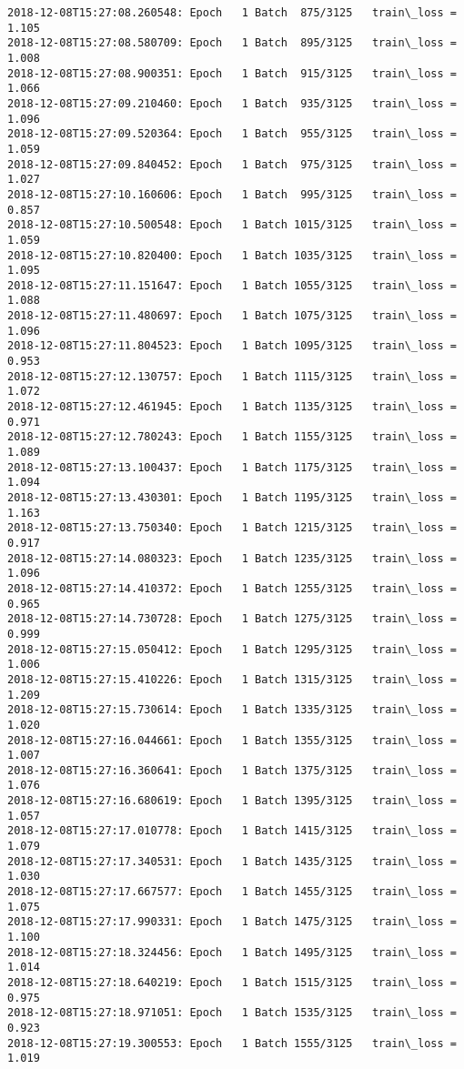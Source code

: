 \documentclass[11pt]{article}
\begin{document}
\begin{Verbatim}[commandchars=\\\{\}]
2018-12-08T15:27:08.260548: Epoch   1 Batch  875/3125   train\_loss = 1.105
2018-12-08T15:27:08.580709: Epoch   1 Batch  895/3125   train\_loss = 1.008
2018-12-08T15:27:08.900351: Epoch   1 Batch  915/3125   train\_loss = 1.066
2018-12-08T15:27:09.210460: Epoch   1 Batch  935/3125   train\_loss = 1.096
2018-12-08T15:27:09.520364: Epoch   1 Batch  955/3125   train\_loss = 1.059
2018-12-08T15:27:09.840452: Epoch   1 Batch  975/3125   train\_loss = 1.027
2018-12-08T15:27:10.160606: Epoch   1 Batch  995/3125   train\_loss = 0.857
2018-12-08T15:27:10.500548: Epoch   1 Batch 1015/3125   train\_loss = 1.059
2018-12-08T15:27:10.820400: Epoch   1 Batch 1035/3125   train\_loss = 1.095
2018-12-08T15:27:11.151647: Epoch   1 Batch 1055/3125   train\_loss = 1.088
2018-12-08T15:27:11.480697: Epoch   1 Batch 1075/3125   train\_loss = 1.096
2018-12-08T15:27:11.804523: Epoch   1 Batch 1095/3125   train\_loss = 0.953
2018-12-08T15:27:12.130757: Epoch   1 Batch 1115/3125   train\_loss = 1.072
2018-12-08T15:27:12.461945: Epoch   1 Batch 1135/3125   train\_loss = 0.971
2018-12-08T15:27:12.780243: Epoch   1 Batch 1155/3125   train\_loss = 1.089
2018-12-08T15:27:13.100437: Epoch   1 Batch 1175/3125   train\_loss = 1.094
2018-12-08T15:27:13.430301: Epoch   1 Batch 1195/3125   train\_loss = 1.163
2018-12-08T15:27:13.750340: Epoch   1 Batch 1215/3125   train\_loss = 0.917
2018-12-08T15:27:14.080323: Epoch   1 Batch 1235/3125   train\_loss = 1.096
2018-12-08T15:27:14.410372: Epoch   1 Batch 1255/3125   train\_loss = 0.965
2018-12-08T15:27:14.730728: Epoch   1 Batch 1275/3125   train\_loss = 0.999
2018-12-08T15:27:15.050412: Epoch   1 Batch 1295/3125   train\_loss = 1.006
2018-12-08T15:27:15.410226: Epoch   1 Batch 1315/3125   train\_loss = 1.209
2018-12-08T15:27:15.730614: Epoch   1 Batch 1335/3125   train\_loss = 1.020
2018-12-08T15:27:16.044661: Epoch   1 Batch 1355/3125   train\_loss = 1.007
2018-12-08T15:27:16.360641: Epoch   1 Batch 1375/3125   train\_loss = 1.076
2018-12-08T15:27:16.680619: Epoch   1 Batch 1395/3125   train\_loss = 1.057
2018-12-08T15:27:17.010778: Epoch   1 Batch 1415/3125   train\_loss = 1.079
2018-12-08T15:27:17.340531: Epoch   1 Batch 1435/3125   train\_loss = 1.030
2018-12-08T15:27:17.667577: Epoch   1 Batch 1455/3125   train\_loss = 1.075
2018-12-08T15:27:17.990331: Epoch   1 Batch 1475/3125   train\_loss = 1.100
2018-12-08T15:27:18.324456: Epoch   1 Batch 1495/3125   train\_loss = 1.014
2018-12-08T15:27:18.640219: Epoch   1 Batch 1515/3125   train\_loss = 0.975
2018-12-08T15:27:18.971051: Epoch   1 Batch 1535/3125   train\_loss = 0.923
2018-12-08T15:27:19.300553: Epoch   1 Batch 1555/3125   train\_loss = 1.019

\end{Verbatim}
\end{document}
